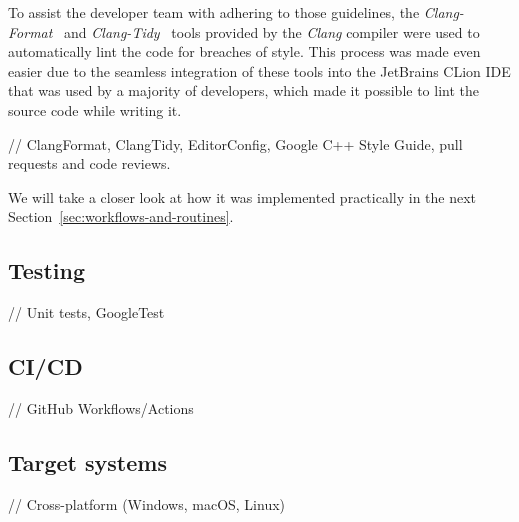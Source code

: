 To assist the developer team with adhering to those guidelines, the \textit{Clang-Format}~\cite{clang-format} and
\textit{Clang-Tidy}~\cite{clang-tidy} tools provided by the \textit{Clang} compiler were used to automatically lint
the code for breaches of style.
This process was made even easier due to the seamless integration of these tools into the JetBrains CLion IDE that was
used by a majority of developers, which made it possible to lint the source code while writing it.

// ClangFormat, ClangTidy, EditorConfig, Google C++ Style Guide, pull requests and code reviews.

We will take a closer look at how it was implemented practically in the next Section~\ref{sec:workflows-and-routines}.


\subsection{Testing}\label{subsec:testing}

// Unit tests, GoogleTest

\subsection{CI/CD}\label{subsec:ci/cd}

// GitHub Workflows/Actions

\subsection{Target systems}\label{subsec:target-systems}

// Cross-platform (Windows, macOS, Linux)
